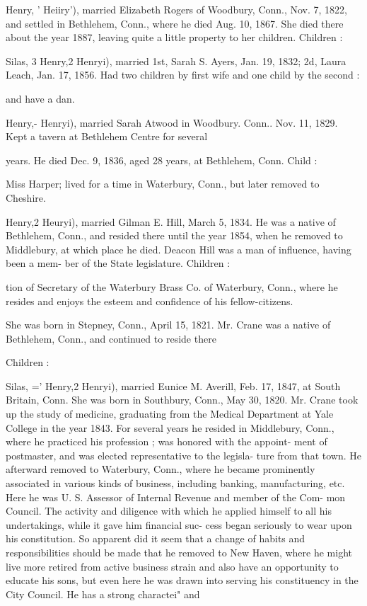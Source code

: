 \documentclass{book}
\begin{document}
Henry, ' Heiiry'), married Elizabeth Rogers of Woodbury, Conn., 
Nov. 7, 1822, and settled in Bethlehem, Conn., where he died 
Aug. 10, 1867. She died there about the year 1887, leaving 
quite a little property to her children. Children : 






Silas, 3 Henry,2 Henryi), married 1st, Sarah S. Ayers, Jan. 19, 
1832; 2d, Laura Leach, Jan. 17, 1856. Had two children by 
first wife and one child by the second : 

and have a dan. 

Henry,- Henryi), married Sarah Atwood in Woodbury. Conn.. 
Nov. 11, 1829. Kept a tavern at Bethlehem Centre for several 




years. He died Dec. 9, 1836, aged 28 years, at Bethlehem, 
Conn. Child : 


Miss Harper; lived for a time in Waterbury, Conn., but 
later removed to Cheshire. 

Henry,2 Heuryi), married Gilman E. Hill, March 5, 1834. He 
was a native of Bethlehem, Conn., and resided there until the 
year 1854, when he removed to Middlebury, at which place he 
died. Deacon Hill was a man of influence, having been a mem- 
ber of the State legislature. Children : 



tion of Secretary of the Waterbury Brass Co. of Waterbury, 
Conn., where he resides and enjoys the esteem and confidence 
of his fellow-citizens. 

She was born in Stepney, Conn., April 15, 1821. Mr. Crane 
was a native of Bethlehem, Conn., and continued to reside there 

Children : 







Silas, =' Henry,2 Henryi), married Eunice M. Averill, Feb. 17, 
1847, at South Britain, Conn. She was born in Southbury, 
Conn., May 30, 1820. Mr. Crane took up the study of medicine, 
graduating from the Medical Department at Yale College in the 
year 1843. For several years he resided in Middlebury, Conn., 
where he practiced his profession ; was honored with the appoint- 
ment of postmaster, and was elected representative to the legisla- 
ture from that town. He afterward removed to Waterbury, 
Conn., where he became prominently associated in various kinds 
of business, including banking, manufacturing, etc. Here he 
was U. S. Assessor of Internal Revenue and member of the Com- 
mon Council. The activity and diligence with which he applied 
himself to all his undertakings, while it gave him financial suc- 
cess began seriously to wear upon his constitution. So apparent 
did it seem that a change of habits and responsibilities should be 
made that he removed to New Haven, where he might live more 
retired from active business strain and also have an opportunity 
to educate his sons, but even here he was drawn into serving his 
constituency in the City Council. He has a strong charactei" and 
\end{document}
